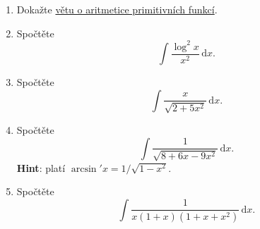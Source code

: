\section*{}
\begin{enumerate}
 \item Dokažte \hyperref[thm:aritmetika-primitivnich-funkci]{větu o aritmetice
  primitivních funkcí}.
 \item Spočtěte
  \[
   \int \frac{\log^2 x}{x^2} \, \mathrm{d}x.
  \]
 \item Spočtěte
  \[
   \int \frac{x}{\sqrt{2 + 5x^2}} \, \mathrm{d}x.
  \]
 \item Spočtěte
  \[
   \int \frac{1}{\sqrt{8 + 6x - 9x^2}} \, \mathrm{d}x.
  \]
  \textbf{Hint}: platí $\arcsin'x = 1 / \sqrt{1 - x^2}$.
 \item 
  Spočtěte
  \[
   \int \frac{1}{x(1+x)(1 + x + x^2)} \, \mathrm{d}x. 
  \]
\end{enumerate}
